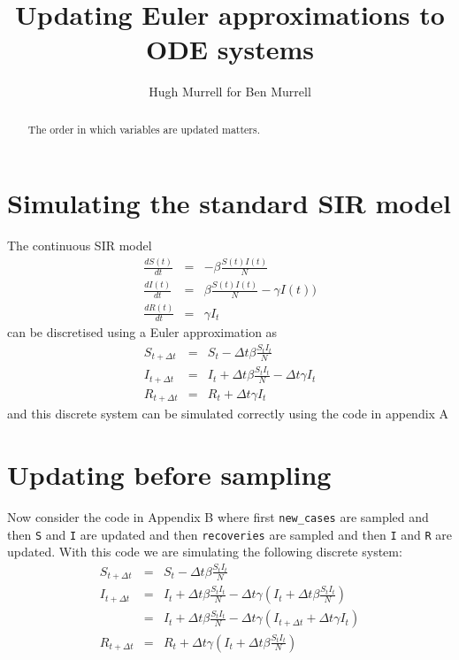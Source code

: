 \documentclass[11pt]{article}
\begin{document}
\title{Updating Euler approximations to ODE systems}
\author{ Hugh Murrell for Ben Murrell}
\maketitle

\begin{abstract}
The order in which variables are updated matters.
\end{abstract}

\section{Simulating the standard SIR model}
The continuous SIR model \cite{Wikipedia} 
\begin{eqnarray}
\frac{dS(t)}{dt} & = & - \beta \frac{S(t) I(t)}{N}  \nonumber \\
\frac{dI(t)}{dt} & = &  \beta \frac{S(t) I(t)}{N} - \gamma I(t)  )\label{eq2}  \\
\frac{dR(t)}{dt} & = &  \gamma I_t \nonumber
\end{eqnarray}
can be discretised using a Euler approximation as
\begin{eqnarray}
S_{t+\Delta t} & = & S_t - \Delta t \beta \frac{S_t I_t}{N}  \nonumber \\
I_{t+\Delta t} & = & I_t + \Delta t \beta \frac{S_t I_t}{N} -  \Delta t \gamma I_t  \label{eq2}  \\
R_{t+\Delta t} & = & R_t + \Delta t  \gamma I_t \nonumber
\end{eqnarray}
and this discrete system can be simulated correctly using the code in appendix A

\section{Updating before sampling}
Now consider the code in Appendix B where first {\tt new\_cases} are sampled
and then {\tt S} and {\tt I} are updated and then {\tt recoveries} are sampled and
then {\tt I} and {\tt R} are updated. With this code we are simulating the
following discrete system:
\begin{eqnarray}
S_{t+\Delta t} & = & S_t - \Delta t \beta \frac{S_t I_t}{N}  \nonumber \\
I_{t+\Delta t} & = & I_t + \Delta t \beta \frac{S_t I_t}{N} -  \Delta t \gamma ( I_t + \Delta t \beta \frac{S_t I_t}{N} )  \nonumber \\
                     & = &  I_t + \Delta t \beta \frac{S_t I_t}{N} -  \Delta t \gamma ( I_{t+\Delta t} + \Delta t \gamma I_t ) \label{eq3}  \\
R_{t+\Delta t} & = & R_t + \Delta t  \gamma ( I_t + \Delta t \beta \frac{S_t I_t}{N} ) \nonumber
\end{eqnarray}
\end{document}
